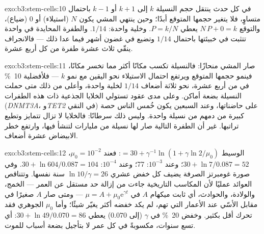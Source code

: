 \begin{solution}{exo:b3:stem-cells:10}
في كل حدث ينتقل حجم النسيلة $k$ إلى $k + 1$ أو $k - 1$ باحتمال
متساوٍ، فلا يتغير حجمها المتوقع أبدًا؛ وحين ينتهي المشي يكون
$N$ (استيلاء) أو $0$ (ضياع)، والتوقع $N\,P + 0 = k$
يعطي $P = k/N$. وخلية واحدة: $1/14$. والطفرة المحايدة في  واحدة تتثبت في خبيئتها باحتمال $1/14$ وتضيع في غضون
أشهر فيما عدا ذلك --- فالانجراف ينقّي ثلاث عشرة طفرة من كل
أربع عشرة.
\end{solution}

\begin{solution}{exo:b3:stem-cells:11}
صار المشي منحازًا: فالنسيلة تكسب مكانًا أكثر مما تخسر
مكانًا، فينمو حجمها المتوقع ويرتفع احتمال الاستيلاء نحو
اليقين مع نمو $k$ --- فلأفضلية \qty{10}{\%} في
 من أربع عشرة، نحو ثلاثة أضعاف $1/14$ لخلية واحدة،
وأعلى من ذلك متى حملت النسيلة بضعة أماكن. وعلى مدى عقود
تستولي الخلايا الجذعية ذات هذه الطفرات (\emph{DNMT3A}،
و\emph{TET2} في النقي) على حاضناتها، وعند السبعين يكون خُمس
الناس حصة كبيرة من دمهم من نسيلة واحدة. وليس ذلك سرطانًا:
فالخلايا لا تزال تتمايز وتطيع تراتبها. غير أن الطفرة التالية
صار لها نسيلة من مليارات لتنشأ فيها، وارتفع خطر الابيضاض
عشرة أضعاف.
\end{solution}

\begin{solution}{exo:b3:stem-cells:12}
الوسيط $= 30 + \gamma^{-1}\ln(1 + \gamma\ln 2/\mu_{0})$: فعند $\mu_{0} =
10^{-2}$، $30 + \ln 7/0.087 = 52$؛ وعند $10^{-3}$: 77؛ وعند $10^{-4}$: $30 +
\ln 604/0.087 = 104$. وفي صورة غومبرتز الصرفة يضيف كل خفض عشري
$\ln 10/\gamma = 26$ سنة نفسها. وتتناقص العوائد عمليًا
لأن المكاسب التاريخية جاءت من إزالة حد مستقل عن العمر
--- الخمج، والولادة، والحوادث، أي ثابت ميكهام $A$ في $\mu = A
+ \mu_{0}\mathrm{e}^{\gamma t}$ --- ومتى صار $A$ صغيرًا في مقابل
الأسّي عند الأعمار التي تهم، لم يكد خفضه أكثر يغيّر شيئًا؛
وأما $\mu_{0}$ الجوهري فقد تحرك أقل بكثير. وخفض \qty{20}{\%}
في $\gamma$ (إلى $0.070$) يعطي $30 + \ln 49/0.070 = 86$: أي تسع سنوات،
مكسوبةً في كل عمر لا بتأجيل بضعة أسباب للموت.
\end{solution}

